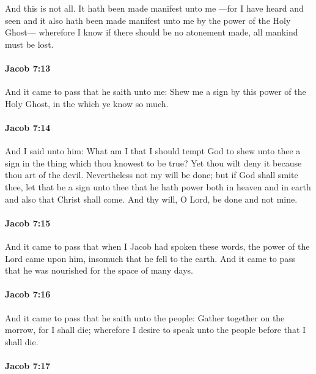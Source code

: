 			And this is not all.
			It hath been made manifest unto me
			---for I have heard and seen
			and it also hath been made manifest unto me
			by the power of the Holy Ghost---
			wherefore I know if there should be no atonement made,
			all mankind must be lost.

		\paragraph{Jacob 7:13} %
			\label{JACOB-7-13}

			And it came to pass that he saith unto me:
			Shew me a sign by this power of the Holy Ghost,
			in the which ye know so much.

		\paragraph{Jacob 7:14} %
			\label{JACOB-7-14}

			And I said unto him:
			What am I that I should tempt God to shew unto thee a sign
			in the thing which thou knowest to be true?
			Yet thou wilt deny it because thou art of the devil.
			Nevertheless not my will be done;
			but if God shall smite thee, let that be a sign unto thee
			that he hath power both in heaven and in earth
			and also that Christ shall come.
			And thy will, O Lord, be done and not mine.

		\paragraph{Jacob 7:15} %
			\label{JACOB-7-15}

			And it came to pass that when I Jacob had spoken these words,
			the power of the Lord came upon him,
			insomuch that he fell to the earth.
			And it came to pass that he was nourished for the space of many days.

		\paragraph{Jacob 7:16} %
			\label{JACOB-7-16}

			And it came to pass that he saith unto the people:
			Gather together on the morrow, for I shall die;
			wherefore I desire to speak unto the people before that I shall die.

		\paragraph{Jacob 7:17} %
			\label{JACOB-7-17}

